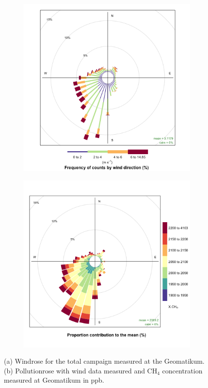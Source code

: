\begin{figure}
\centering
\begin{subfigure}{.5\textwidth}
  \centering
  \includegraphics[width=1\linewidth]{figures/Appendix/Windrose/WindRose_Total_medium_peaks.png}
  \caption{}
  \label{WindroseTotal}
\end{subfigure}%
\begin{subfigure}{.5\textwidth}
  \centering
  \includegraphics[width=1\linewidth]{figures/Appendix/Windrose/PollutionRose_Total_medium_peaks.png}
  \caption{}
  \label{PollutionroseTotal}
\end{subfigure}
\caption[Windrose and Pollutionrose for total timeline at Geomatikum]{(a) Windrose for the total campaign measured at the Geomatikum. (b) Pollutionrose with wind data measured and CH$_4$ concentration measured at Geomatikum in ppb. }
\label{RoseTotalGeomatikum}
\end{figure}

